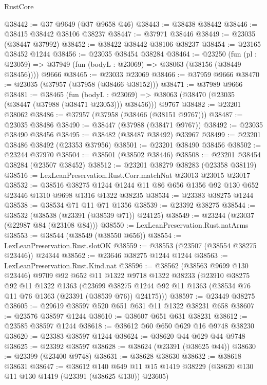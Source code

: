 \begin{lexlean}{RustCore}
\begin{coremodule}
@38442 := @37 @9649 (@37 @9658 @46)
@38443 := @38438 @38442
@38446 := @38415 @38442 @38106 @38237
@38447 := @37971 @38446
@38449 := @23035 (@38447 @37992)
@38452 := @38422 @38442 @38106 @38237
@38454 := @23165 @38452 @1244
@38456 := @23035 @38454 @38284
@38464 := @23250
    (fun (pl : @23059) => @37949 (fun (bodyL : @23069) => @38063 (@38156 (@38449 @38456))))
    @9666
@38465 := @23033 @23069
@38466 := @37959 @9666
@38470 := @23035 (@37957 (@37958 (@38466 @38152)))
@38471 := @37989 @9666
@38481 := @38465
    (fun (bodyL : @23069) => @38063 (@38470 (@23035 (@38447 (@37988 (@38471 @23053))) @38456)))
    @9767
@38482 := @23201 @38062
@38486 := @37957 (@37958 (@38466 (@38151 @9767)))
@38487 := @23035 @38486
@38490 := @38447 (@37988 (@38471 @9767))
@38492 := @23035 @38490 @38456
@38495 := @38482 (@38487 @38492) @33967
@38499 := @23201 @38486 @38492 (@23353 @37956)
@38501 := @23201 @38490 @38456
@38502 := @23244 @37970
@38504 := @38501 (@38502 @38446)
@38508 := @23201 @38454 @38284 (@23507 @38452)
@38512 := @23201 @38279 @38283 (@23358 @38119)
@38516 := LexLeanPreservation.Rust.Corr.matchNat @23013 @23015 @23017
@38532 := @38516
    @38275
    @1244
    @1244
    @11
    @86
    @656
    @1356
    @92
    @130
    @652
    @23446
    @1310
    @9698
    @1316
    @1322
    @38235
@38534 := @23383 @38275 @1244
@38538 := @38534 @71 @11 @71 @1356
@38539 := @23392 @38275
@38544 := @38532 (@38538 (@23391 (@38539 @71)) @24125)
@38549 := @23244 (@23037 (@22987 @84 (@23108 @84)))
@38550 := LexLeanPreservation.Rust.natArms
@38553 := @38544 (@38549 (@38550 @656))
@38554 := LexLeanPreservation.Rust.slotOK
@38559 := @38553 (@23507 (@38554 @38275 @23446)) @24344
@38562 := @23646 @38275 @1244 @1244
@38563 := LexLeanPreservation.Rust.Kind.nat
@38596 := @38562
    (@38563 @9699 @130 @23446)
    @9709
    @92
    @652
    @11
    @1322
    @9718
    @1322
    @38233
    (@23910
      @38275
      @92
      @11
      @1322
      @1363
      (@23699 @38275 @1244 @92 @11 @1363 (@38534 @76 @11 @76 @1363 (@23391 (@38539 @76)) @24175)))
@38597 := @23449 @38275
@38605 := @29619 @38597 @520 @651 @631 @11 @1322 @38231 @658
@38607 := @23576 @38597 @1244
@38610 := @38607 @651 @631 @38231
@38612 := @23585 @38597 @1244
@38618 := @38612 @60 @650 @629 @16 @9748 @38230
@38620 := @23383 @38597 @1244
@38624 := @38620 @44 @629 @44 @9748
@38625 := @23392 @38597
@38628 := @38624 (@23391 (@38625 @44))
@38630 := @23399 (@23400 @9748)
@38631 := @38628 @38630
@38632 := @38618 @38631
@38647 := @38612
    @140
    @649
    @11
    @15
    @1419
    @38229
    (@38620 @130 @11 @130 @1419 (@23391 (@38625 @130)) @23605)

\end{coremodule}
\end{lexlean}
